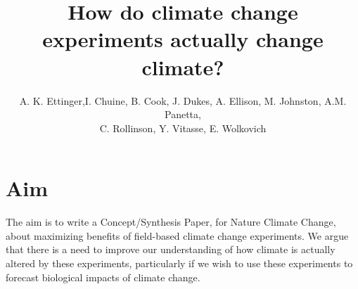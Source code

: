 \documentclass{article}
\begin{document}
 
\title{How do climate change experiments actually change climate?} %

\author{A. K. Ettinger,I. Chuine, B. Cook, J. Dukes, A. Ellison, M. Johnston, A.M. Panetta,\\ C. Rollinson, Y. Vitasse, E. Wolkovich}
\maketitle  %

\section* {Aim}

The aim is to write a Concept/Synthesis Paper, for Nature Climate Change, about maximizing benefits of field-based climate change experiments. We argue that there is a need to improve our understanding of how climate is actually altered by these experiments, particularly if we wish to use these experiments to forecast biological impacts of climate change. %

\end{document}
